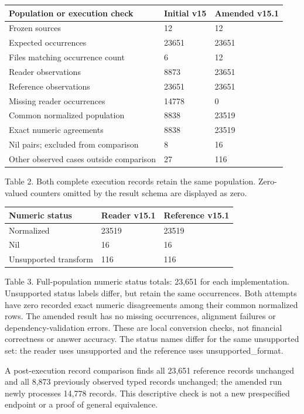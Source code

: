 \documentclass[10pt,a4paper]{article}
\begin{document}
\begin{longtable}{@{}p{}p{}p{}@{}}\toprule
\textbf{Population or execution check} & \textbf{Initial v15} & \textbf{Amended v15.1} \\ \midrule\endhead
Frozen sources & 12 & 12 \\
Expected occurrences & 23651 & 23651 \\
Files matching occurrence count & 6 & 12 \\
Reader observations & 8873 & 23651 \\
Reference observations & 23651 & 23651 \\
Missing reader occurrences & 14778 & 0 \\
Common normalized population & 8838 & 23519 \\
Exact numeric agreements & 8838 & 23519 \\
Nil pairs; excluded from comparison & 8 & 16 \\
Other observed cases outside comparison & 27 & 116 \\
\bottomrule\end{longtable}
{\small Table 2. Both complete execution records retain the same population. Zero-valued counters omitted by the result schema are displayed as zero.}
\begin{longtable}{@{}p{}p{}p{}@{}}\toprule
\textbf{Numeric status} & \textbf{Reader v15.1} & \textbf{Reference v15.1} \\ \midrule\endhead
Normalized & 23519 & 23519 \\
Nil & 16 & 16 \\
Unsupported transform & 116 & 116 \\
\bottomrule\end{longtable}
{\small Table 3. Full-population numeric status totals: 23,651 for each implementation. Unsupported status labels differ, but retain the same occurrences.}
Both attempts have zero recorded exact numeric disagreements among their common normalized rows. The amended result has no missing occurrences, alignment failures or dependency-validation errors. These are local conversion checks, not financial correctness or answer accuracy. The status names differ for the same unsupported set: the reader uses unsupported and the reference uses unsupported\_format.

A post-execution record comparison finds all 23,651 reference records unchanged and all 8,873 previously observed typed records unchanged; the amended run newly processes 14,778 records. This descriptive check is not a new prespecified endpoint or a proof of general equivalence.
\end{document}
